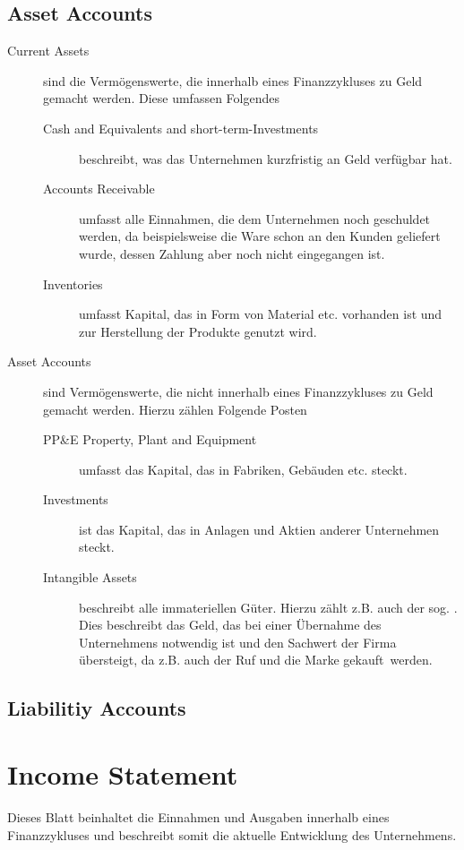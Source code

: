 \subsection{Asset Accounts}
\begin{description}
    \item[Current Assets] sind die Vermögenswerte, die innerhalb eines Finanzzykluses zu Geld gemacht werden.
        Diese umfassen Folgendes 
        \begin{description}
            \item[Cash and Equivalents and short-term-Investments] beschreibt, was das Unternehmen kurzfristig an Geld verfügbar hat.
            \item[Accounts Receivable] umfasst alle Einnahmen, die dem Unternehmen noch geschuldet werden, da beispielsweise die Ware schon an den Kunden geliefert wurde, dessen Zahlung aber noch nicht eingegangen ist.
            \item[Inventories] umfasst Kapital, das in Form von Material etc. vorhanden ist und zur Herstellung der Produkte genutzt wird.
        \end{description}
    \item[Asset Accounts] sind Vermögenswerte, die nicht innerhalb eines Finanzzykluses zu Geld gemacht werden.
        Hierzu zählen Folgende Posten
        \begin{description}
            \item[PP\&E Property, Plant and Equipment] umfasst das Kapital, das in Fabriken, Gebäuden etc. steckt.
            \item[Investments] ist das Kapital, das in Anlagen und Aktien anderer Unternehmen steckt.
            \item[Intangible Assets] beschreibt alle immateriellen Güter. Hierzu zählt z.B. auch der sog. . 
                Dies beschreibt das Geld, das bei einer Übernahme des Unternehmens notwendig ist und den Sachwert der Firma übersteigt, da z.B. auch der Ruf und die Marke \glqq gekauft\grqq\ werden.   
        \end{description}
\end{description}

\subsection{Liabilitiy Accounts}

\section{Income Statement}
Dieses Blatt beinhaltet die Einnahmen und Ausgaben innerhalb eines Finanzzykluses und beschreibt somit die aktuelle Entwicklung des Unternehmens.

